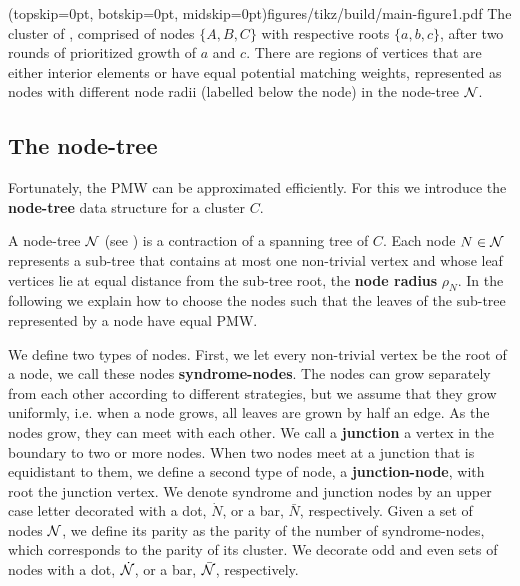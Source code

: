 \Figure[bt](topskip=0pt, botskip=0pt, midskip=0pt){figures/tikz/build/main-figure1.pdf}{
    The cluster of , comprised of nodes $\{A, B, C\}$ with respective roots $\{a, b, c\}$, after two rounds of prioritized growth of $a$ and $c$. There are regions of vertices that are either interior elements or have equal potential matching weights, represented as nodes with different node radii (labelled below the node) in the node-tree $\mathcal{N}$. \label{fig:pmw}}

\subsection{The node-tree}\label{sec:nodeset}
Fortunately, the PMW can be approximated efficiently. 
For this we introduce the \textbf{node-tree} data structure for a cluster $C$. 

A node-tree $\mathcal{N}$ (see ) is a contraction of a spanning tree of $C$. Each node $N\in\mathcal{N}$ represents a sub-tree that contains at most one non-trivial vertex and whose leaf vertices lie at equal distance from the sub-tree root, the \textbf{node radius} $\rho_N$. In the following we explain how to choose the nodes such that the leaves of the sub-tree represented by a node have equal PMW.

We define two types of nodes. First, we let every non-trivial vertex be the root of a node, we call these nodes \textbf{syndrome-nodes}. The nodes can grow separately from each other according to different strategies, but we assume that they grow uniformly, i.e. when a node grows, all leaves are grown by half an edge.
As the nodes grow, they can meet with each other. We call a \textbf{junction} a vertex in the boundary to two or more nodes. When two nodes meet at a junction that is equidistant to them, we define a second type of node, a \textbf{junction-node}, with root the junction vertex. 
We denote syndrome and junction nodes by an upper case letter decorated with a dot, $\dot{N}$, or a bar, $\bar{N}$, respectively. Given a set of nodes $\mathcal{N}$, we define its parity as the parity of the number of syndrome-nodes, which corresponds to the parity of its cluster. We decorate odd and even sets of nodes with a dot, $\dot{\mathcal{N}}$, or a bar, $\bar{\mathcal{N}}$, respectively.

